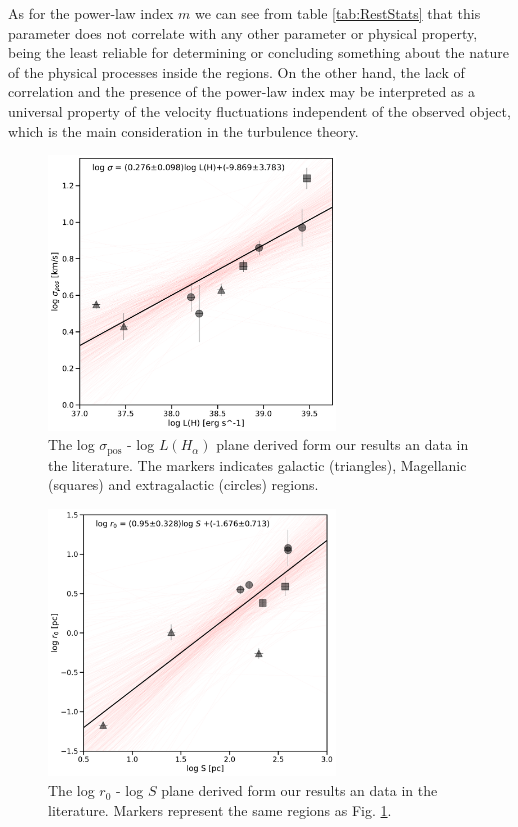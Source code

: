 \documentclass[fleqn,usenatbib, useAMS, a4paper]{mnras}
\newcommand\pos{\ensuremath{_{\mathrm{pos}}}}
\begin{document}
As for the power-law index \(m\) we can see from table \ref{tab:RestStats} that this parameter does not correlate with any other parameter or physical property, being the least reliable for determining or concluding something about the nature of the physical processes inside the regions.
On the other hand, the lack of correlation and the presence of the power-law index may be interpreted as a universal property of the velocity fluctuations independent of the observed object, which is the main consideration in the turbulence theory.



\begin{figure}
\centering 
\includegraphics[width=3in]{Figures/corr-svsL}
\caption{The log \(\sigma\pos\) - log $L(H_{\alpha})$ plane derived form our results an data in the literature. The markers indicates galactic (triangles), Magellanic (squares) and extragalactic (circles) regions. }
\label{fig:sigvsl}
\end{figure}

\begin{figure}
\centering 
\includegraphics[width=3in]{Figures/corr-rvsS}
\caption{The log \(r_0\) - log \(S\) plane derived form our results an data in the literature. Markers represent the same regions as Fig. \ref{fig:sigvsl}. }
\label{fig:rvsR}
\end{figure}
\end{document}
